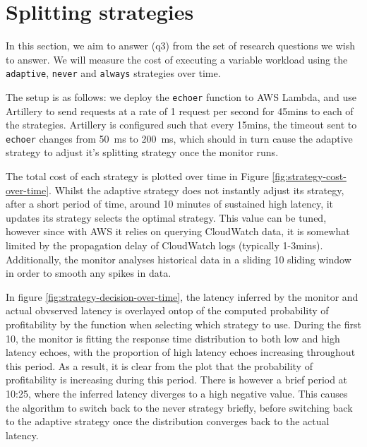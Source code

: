 
\section{Splitting strategies}
In this section, we aim to answer (q3) from the set of research questions we wish to answer. We will measure the cost of executing a variable workload using the \verb|adaptive|, \verb|never| and \verb|always| strategies over time.

The setup is as follows: we deploy the \verb|echoer| function to AWS Lambda, and use Artillery\cite{artilleryArtilleryCloudscaleLoad} to send requests at a rate of 1 request per second for 45mins to each of the strategies. Artillery is configured such that every 15mins, the timeout sent to \verb|echoer| changes from \SI{50}{\milli\second} to \SI{200}{\milli\second}, which should in turn cause the adaptive strategy to adjust it's splitting strategy once the monitor runs.

The total cost of each strategy is plotted over time in Figure \ref{fig:strategy-cost-over-time}. Whilst the adaptive strategy does not instantly adjust its strategy, after a short period of time, around 10 minutes of sustained high latency, it updates its strategy selects the optimal strategy. This value can be tuned, however since with AWS it relies on querying CloudWatch data, it is somewhat limited by the propagation delay of CloudWatch logs (typically 1-3mins). Additionally, the monitor analyses historical data in a sliding \SI{10}{\min} sliding window in order to smooth any spikes in data.

\begin{figure*}
    \begin{center}
        
    \end{center}
    \caption{Strategy cost over time.}
    \label{fig:strategy-cost-over-time}
\end{figure*}

In figure \ref{fig:strategy-decision-over-time}, the latency inferred by the monitor and actual obvserved latency is overlayed ontop of the computed probability of profitability by the function when selecting which strategy to use. During the first \SI{10}{\min}, the monitor is fitting the response time distribution to both low and high latency echoes, with the proportion of high latency echoes increasing throughout this period. As a result, it is clear from the plot that the probability of profitability is increasing during this period. There is however a brief period at 10:25, where the inferred latency diverges to a high negative value. This causes the algorithm to switch back to the never strategy briefly, before switching back to the adaptive strategy once the distribution converges back to the actual latency.

